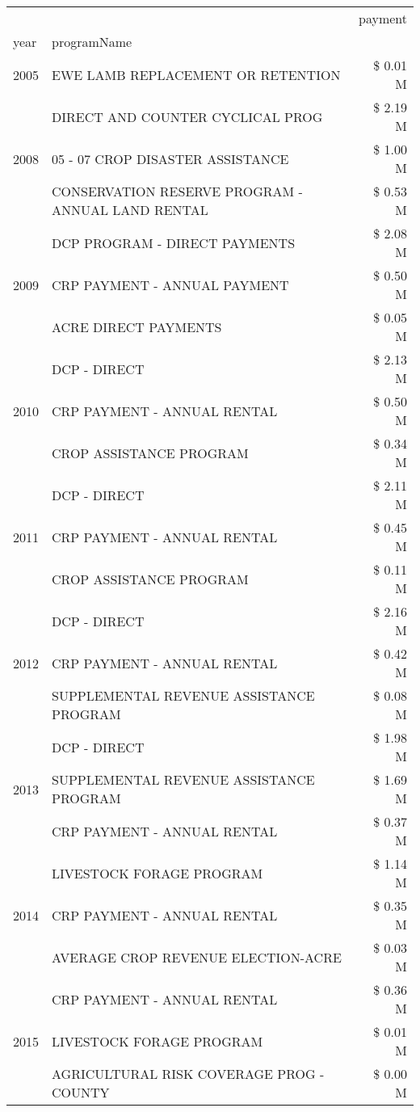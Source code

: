 \begin{tabular}{llr}
\toprule
 &  & payment \\
year & programName &  \\
\midrule
2005 & EWE LAMB REPLACEMENT OR RETENTION & \$ 0.01 M \\
\cline{1-3}
\multirow[t]{3}{*}{2008} & DIRECT AND COUNTER CYCLICAL PROG & \$ 2.19 M \\
 & 05 - 07 CROP DISASTER ASSISTANCE & \$ 1.00 M \\
 & CONSERVATION RESERVE PROGRAM - ANNUAL LAND RENTAL & \$ 0.53 M \\
\cline{1-3}
\multirow[t]{3}{*}{2009} & DCP PROGRAM - DIRECT PAYMENTS & \$ 2.08 M \\
 & CRP PAYMENT - ANNUAL PAYMENT & \$ 0.50 M \\
 & ACRE DIRECT PAYMENTS & \$ 0.05 M \\
\cline{1-3}
\multirow[t]{3}{*}{2010} & DCP - DIRECT & \$ 2.13 M \\
 & CRP PAYMENT - ANNUAL RENTAL & \$ 0.50 M \\
 & CROP ASSISTANCE PROGRAM & \$ 0.34 M \\
\cline{1-3}
\multirow[t]{3}{*}{2011} & DCP - DIRECT & \$ 2.11 M \\
 & CRP PAYMENT - ANNUAL RENTAL & \$ 0.45 M \\
 & CROP ASSISTANCE PROGRAM & \$ 0.11 M \\
\cline{1-3}
\multirow[t]{3}{*}{2012} & DCP - DIRECT & \$ 2.16 M \\
 & CRP PAYMENT - ANNUAL RENTAL & \$ 0.42 M \\
 & SUPPLEMENTAL REVENUE ASSISTANCE PROGRAM & \$ 0.08 M \\
\cline{1-3}
\multirow[t]{3}{*}{2013} & DCP - DIRECT & \$ 1.98 M \\
 & SUPPLEMENTAL REVENUE ASSISTANCE PROGRAM & \$ 1.69 M \\
 & CRP PAYMENT - ANNUAL RENTAL & \$ 0.37 M \\
\cline{1-3}
\multirow[t]{3}{*}{2014} & LIVESTOCK FORAGE PROGRAM & \$ 1.14 M \\
 & CRP PAYMENT - ANNUAL RENTAL & \$ 0.35 M \\
 & AVERAGE CROP REVENUE ELECTION-ACRE & \$ 0.03 M \\
\cline{1-3}
\multirow[t]{3}{*}{2015} & CRP PAYMENT - ANNUAL RENTAL & \$ 0.36 M \\
 & LIVESTOCK FORAGE PROGRAM & \$ 0.01 M \\
 & AGRICULTURAL RISK COVERAGE PROG - COUNTY & \$ 0.00 M \\

\end{tabular}

